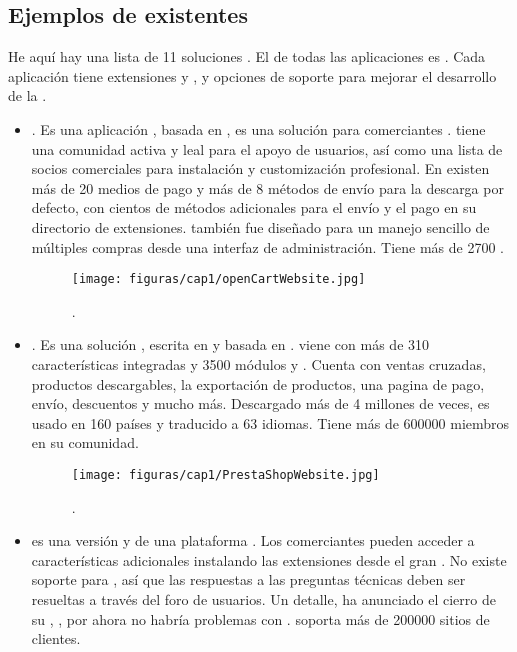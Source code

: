 \subsection{Ejemplos de \frameworksPC \ecommerceCOM existentes}

He aquí hay una lista de 11 soluciones \ecommerceCOM \openSourcePC. El \coreAS de todas las aplicaciones es \freePC. Cada aplicación tiene extensiones \freePC y \premium, y opciones de soporte para mejorar el desarrollo de la \store.

\begin{itemize}
	\item \textbf{\nameOpenCart}. Es una aplicación \openSourcePC, basada en \phpNAME, es una solución \ecommerceCOM para comerciantes \online. \nameOpenCart tiene una comunidad activa y leal para el apoyo de usuarios, así como una lista de socios comerciales para instalación y customización profesional. En \nameOpenCart existen más de 20 medios de pago y más de 8 métodos de envío para la descarga por defecto, con cientos de métodos adicionales para el envío y el pago en su directorio de extensiones. \nameOpenCart también fue diseñado para un manejo sencillo de múltiples compras desde una interfaz de administración. Tiene más de 2700 \themesCPT.
	
	\begin{figure}[H]
		\centering
		\texttt{[image: figuras/cap1/openCartWebsite.jpg]}
		\caption{\nameOpenCart \websiteINT \cite{online_OpenCartWebsite}.}
	\end{figure}


	\item \textbf{\namePrestaShop}. Es una solución \ecommerceCOM \openSourcePC, escrita en \phpNAME y basada en \smartyTemplateEngine. \namePrestaShop viene con más de 310 características integradas y 3500 módulos y \templatesAS. Cuenta con ventas cruzadas, productos descargables, la exportación de productos, una pagina de pago, envío, descuentos y mucho más. Descargado más de 4 millones de veces, \namePrestaShop es usado en 160 países y traducido a 63 idiomas. Tiene más de 600000 miembros en su comunidad.

	\begin{figure}[H]
		\centering
		\texttt{[image: figuras/cap1/PrestaShopWebsite.jpg]}
		\caption{\namePrestaShop \websiteINT \cite{online_PrestaShop}.}
	\end{figure}


	\item \textbf{\nameMagento \Community \Edition} es una versión \freePC y \openSourcePC de una plataforma \ecommerceCOM. Los comerciantes pueden acceder a características adicionales instalando las extensiones desde el gran \nameMagento \connectCustom \marketplace. No existe soporte para \nameMagento \Community \Edition, así que las respuestas a las preguntas técnicas deben ser resueltas a través del foro de usuarios. Un detalle, \nameMagento ha anunciado el cierro de su \hosted \solution, \nameMagento \go, por ahora no habría problemas con \Community \Edition. \nameMagento \Community \Edition soporta más de 200000 sitios de clientes.


\end{itemize}
